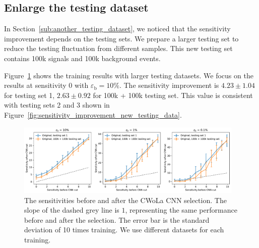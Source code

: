 \documentclass[12pt]{article}
\begin{document}
    \subsection{Enlarge the testing dataset}%
    \label{sub:enlarge_the_testing_dataset}
        In Section~\ref{sub:another_testing_dataset}, we noticed that the sensitivity improvement depends on the testing sets. We prepare a larger testing set to reduce the testing fluctuation from different samples. This new testing set contains 100k signals and 100k background events.

        Figure~\ref{fig:sensitivity_improvement_larger_testing_data} shows the training results with larger testing datasets. We focus on the results at sensitivity 0 with $\varepsilon_{\text{b}} = 10\%$. The sensitivity improvement is $4.23 \pm 1.04$ for testing set 1, $2.63 \pm 0.92$ for 100k + 100k testing set. This value is consistent with testing sets 2 and 3 shown in Figure~\ref{fig:sensitivity_improvement_new_testing_data}.
        \begin{figure}[htpb]
            \centering
            \includegraphics[width=0.97\textwidth]{HVmodel_sensitivity_improvement_origin_bkg_subtraction_larger_testing_set.pdf}
            \caption{The sensitivities before and after the CWoLa CNN selection. The slope of the dashed grey line is $1$, representing the same performance before and after the selection. The error bar is the standard deviation of 10 times training. We use different datasets for each training.}
            \label{fig:sensitivity_improvement_larger_testing_data}
        \end{figure}
\end{document}
